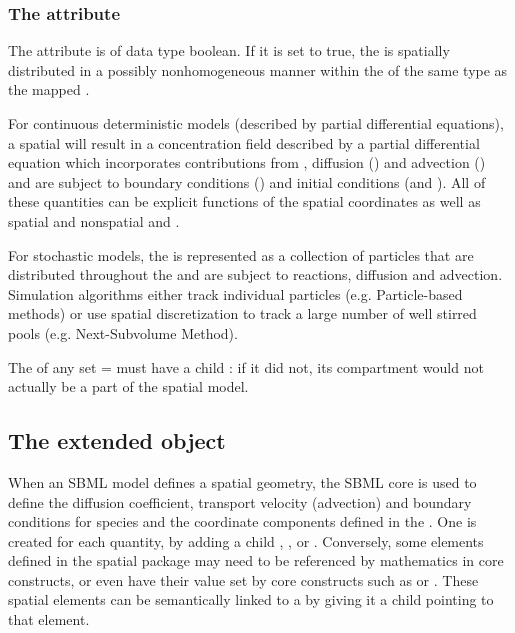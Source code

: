 \subsubsection{The  attribute}
The  attribute is of data type boolean. If it is set to true, the \Species is spatially distributed in a possibly nonhomogeneous manner within the \Domains of the same type as the mapped \DomainType. 

For continuous deterministic models (described by partial differential equations), a spatial \Species will result in a concentration field described by a partial differential equation which incorporates contributions from \Reactions, diffusion (\DiffusionCoefficient) and advection (\AdvectionCoefficient) and are subject to boundary conditions (\BoundaryCondition) and initial conditions (\InitialAssignment and \Rule).  All of these quantities can be explicit functions of the spatial coordinates as well as spatial and nonspatial \Parameters and \Species.  

For stochastic models, the \Species is represented as a collection of particles that are distributed throughout the \Domains and are subject to reactions, diffusion and advection.  Simulation algorithms either track individual particles (e.g. Particle-based methods) or use spatial discretization to track a large number of well stirred pools (e.g. Next-Subvolume Method).

The  of any \Species set  =  must have a child \CompartmentMapping: if it did not, its compartment would not actually be a part of the spatial model.


\subsection{The extended \Parameter object}
\label{extended-parameter-class}
When an SBML model defines a spatial geometry, the SBML core \Parameter is used to define the diffusion coefficient, transport velocity (advection) and boundary conditions for species and the coordinate components defined in the \Geometry. One \Parameter is created for each quantity, by adding a child \DiffusionCoefficient, \AdvectionCoefficient, or \BoundaryCondition.  Conversely, some elements defined in the spatial package may need to be referenced by mathematics in core constructs, or even have their value set by core constructs such as \InitialAssignment or \Rule.  These spatial elements can be semantically linked to a \Parameter by giving it a child \SpatialSymbolReference pointing to that element.

